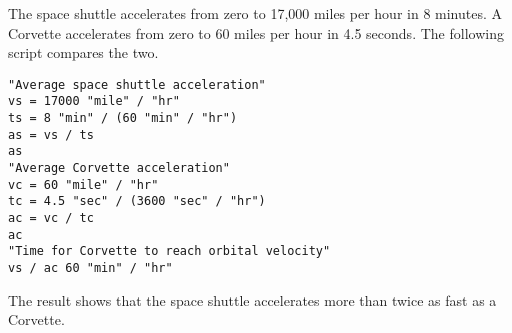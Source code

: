 \documentclass[12pt]{article}
\begin{document}
The space shuttle accelerates from zero to 17,000 miles per hour
in 8 minutes.
A Corvette accelerates from zero to 60 miles per hour in 4.5 seconds.
The following script compares the two.

\begin{verbatim}
"Average space shuttle acceleration"
vs = 17000 "mile" / "hr"
ts = 8 "min" / (60 "min" / "hr")
as = vs / ts
as
"Average Corvette acceleration"
vc = 60 "mile" / "hr"
tc = 4.5 "sec" / (3600 "sec" / "hr")
ac = vc / tc
ac
"Time for Corvette to reach orbital velocity"
vs / ac 60 "min" / "hr"
\end{verbatim}

The result shows that the space shuttle accelerates
more than twice as fast as a Corvette.
\end{document}
